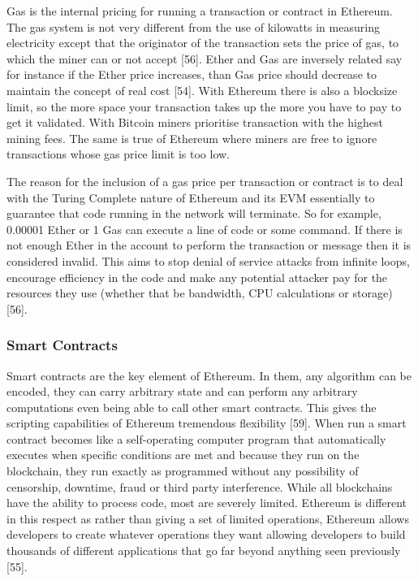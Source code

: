 \documentclass{article}
\begin{document}
Gas is the internal pricing for running a transaction or contract in Ethereum. The gas system is not very different from the use of kilowatts in measuring electricity except that the originator of the transaction sets the price of gas, to which the miner can or not accept {\Large [56]}. Ether and Gas are inversely related say for instance if the Ether price increases, than Gas price should decrease to maintain the concept of real cost {\Large [54]}. With Ethereum there is also a blocksize limit, so the more space your transaction takes up the more you have to pay to get it validated. With Bitcoin miners prioritise transaction with the highest mining fees. The same is true of Ethereum where miners are free to ignore transactions whose gas price limit is too low. 

The reason for the inclusion of a gas price per transaction or contract is to deal with the Turing Complete nature of Ethereum and its EVM essentially to guarantee that code running in the network will terminate. So for example, 0.00001 Ether or 1 Gas can execute a line of code or some command. If there is not enough Ether in the account to perform the transaction or message then it is considered invalid. This aims to stop denial of service attacks from infinite loops, encourage efficiency in the code and make any potential attacker pay for the resources they use (whether that be bandwidth, CPU calculations or storage) {\Large [56]}.

\cleardoublepage
\subsubsection{Smart Contracts}
Smart contracts are the key element of Ethereum. In them, any algorithm can be encoded, they can carry arbitrary state and can perform any arbitrary computations even being able to call other smart contracts. This gives the scripting capabilities of Ethereum tremendous flexibility {\Large [59]}. When run a smart contract becomes like a self-operating computer program that automatically executes when specific conditions are met and because they run on the blockchain, they run exactly as programmed without any possibility of censorship, downtime, fraud or third party interference. While all blockchains have the ability to process code, most are severely limited. Ethereum is different in this respect as rather than giving a set of limited operations, Ethereum allows developers to create whatever operations they want allowing developers to build thousands of different applications that go far beyond anything seen previously {\Large [55]}.
\end{document}
